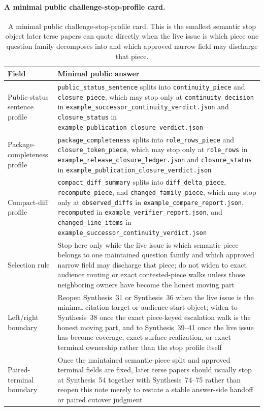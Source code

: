 \documentclass[11pt]{article}
\begin{document}
\paragraph{A minimal public challenge-stop-profile card.}
\begin{table}[t]
\centering
\small
\begin{tabularx}{\linewidth}{@{}lX@{}}
\toprule
Field & Minimal public answer \\
\midrule
Public-status sentence profile & \nolinkurl{public_status_sentence} splits into \nolinkurl{continuity_piece} and \nolinkurl{closure_piece}, which may stop only at \nolinkurl{continuity_decision} in \nolinkurl{example_successor_continuity_verdict.json} and \nolinkurl{closure_status} in \nolinkurl{example_publication_closure_verdict.json} \\
Package-completeness profile & \nolinkurl{package_completeness} splits into \nolinkurl{role_rows_piece} and \nolinkurl{closure_token_piece}, which may stop only at \nolinkurl{role_rows} in \nolinkurl{example_release_closure_ledger.json} and \nolinkurl{closure_status} in \nolinkurl{example_publication_closure_verdict.json} \\
Compact-diff profile & \nolinkurl{compact_diff_summary} splits into \nolinkurl{diff_delta_piece}, \nolinkurl{recompute_piece}, and \nolinkurl{changed_family_piece}, which may stop only at \nolinkurl{observed_diffs} in \nolinkurl{example_compare_report.json}, \nolinkurl{recomputed} in \nolinkurl{example_verifier_report.json}, and \nolinkurl{changed_line_items} in \nolinkurl{example_successor_continuity_verdict.json} \\
Selection rule & Stop here only while the live issue is which semantic piece belongs to one maintained question family and which approved narrow field may discharge that piece; do not widen to exact audience routing or exact contested-piece walks unless those neighboring owners have become the honest moving part \\
Left/right boundary & Reopen Synthesis~31 or Synthesis~36 when the live issue is the minimal citation target or audience start object; widen to Synthesis~38 once the exact piece-keyed escalation walk is the honest moving part, and to Synthesis~39--41 once the live issue has become coverage, exact surface realization, or exact terminal ownership rather than the stop profile itself \\
Paired-terminal boundary & Once the maintained semantic-piece split and approved terminal fields are fixed, later terse papers should usually stop at Synthesis~54 together with Synthesis~74--75 rather than reopen this note merely to restate a stable answer-side handoff or paired cutover judgment \\
\bottomrule
\end{tabularx}
\caption{A minimal public challenge-stop-profile card. This is the smallest semantic stop object later terse papers can quote directly when the live issue is which piece one question family decomposes into and which approved narrow field may discharge that piece.}
\label{tab:minimal-public-challenge-stop-profile-card}
\end{table}
\end{document}
